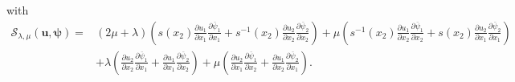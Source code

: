 \documentclass[final,3p,times]{elsarticle}
\begin{document}
with
\begin{align*}
	\mathcal{S}_{\lambda, \mu}(\boldsymbol{u}, \boldsymbol{\psi})
	= & (2 \mu + \lambda)\left(s(x_2)\frac{\partial u_1}{\partial x_1} \frac{\partial \overline{\psi}_1}{\partial x_1}+s^{-1}(x_2)\frac{\partial u_2}{\partial x_2} \frac{\partial \overline{\psi}_2}{\partial x_2}\right)
	+\mu\left(s^{-1}(x_2)\frac{\partial u_1}{\partial x_2} \frac{\partial \overline{\psi}_1}{\partial x_2}+s(x_2)\frac{\partial u_2}{\partial x_1} \frac{\partial \overline{\psi}_2}{\partial x_1}\right) \\
	& +\lambda\left(\frac{\partial u_2}{\partial x_2} \frac{\partial \overline{\psi}_1}{\partial x_1}+\frac{\partial u_1}{\partial x_1} \frac{\partial \overline{\psi}_2}{\partial x_2}\right)+\mu\left(\frac{\partial u_2}{\partial x_1} \frac{\partial \overline{\psi}_1}{\partial x_2}+\frac{\partial u_1}{\partial x_2} \frac{\partial \overline{\psi}_2}{\partial x_1}\right).
\end{align*}
\end{document}
